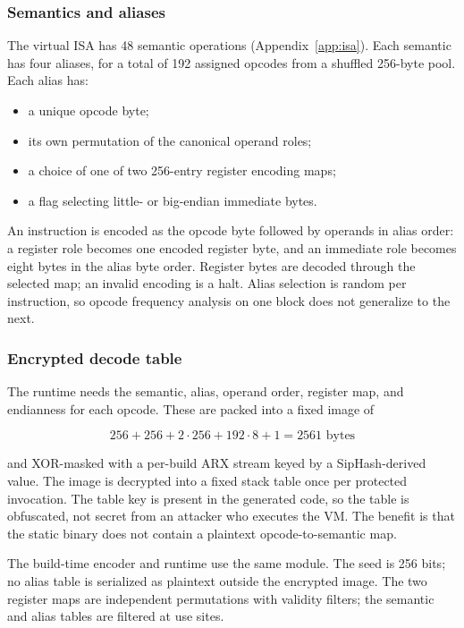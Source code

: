 \subsubsection{Semantics and aliases}

The virtual ISA has 48 semantic operations (Appendix~\ref{app:isa}). Each
semantic has four aliases, for a total of 192 assigned opcodes from a shuffled
256-byte pool. Each alias has:

\begin{itemize}
  \item a unique opcode byte;
  \item its own permutation of the canonical operand roles;
  \item a choice of one of two 256-entry register encoding maps;
  \item a flag selecting little- or big-endian immediate bytes.
\end{itemize}

An instruction is encoded as the opcode byte followed by operands in alias order:
a register role becomes one encoded register byte, and an immediate role becomes
eight bytes in the alias byte order. Register bytes are decoded through the
selected map; an invalid encoding is a  halt. Alias selection is
random per instruction, so opcode frequency analysis on one block does not
generalize to the next.

\subsubsection{Encrypted decode table}

The runtime needs the semantic, alias, operand order, register map, and
endianness for each opcode. These are packed into a fixed image of

\begin{equation}
  256 + 256 + 2 \cdot 256 + 192 \cdot 8 + 1 = 2561 \text{ bytes}
  \label{eq:table-size}
\end{equation}

and XOR-masked with a per-build ARX stream keyed by a SipHash-derived value. The
image is decrypted into a fixed stack table once per protected invocation. The
table key is present in the generated code, so the table is obfuscated, not
secret from an attacker who executes the VM. The benefit is that the static
binary does not contain a plaintext opcode-to-semantic map.

The build-time encoder and runtime use the same  module.
The seed is 256 bits; no alias table is serialized as plaintext outside the
encrypted image. The two register maps are independent permutations with
validity filters; the semantic and alias tables are filtered at use sites.

